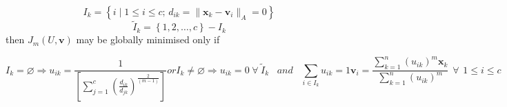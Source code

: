 \documentclass[english]{HSMW-Thesis}
\begin{document}
\begin{theorem}
	$$I_k=\left\lbrace i\mid 1\leq i \leq c;\hspace{2pt} d_{ik}=\parallel \mathbf{x}_k-\mathbf{v}_i\parallel_A=0\right\rbrace$$
	$$\tilde{I}_k=\left\lbrace 1,2,\ldots ,c\right\rbrace - I_k$$
	then\hspace{2pt} $J_m\left( U,\mathbf{v}\right)$\hspace{2pt} may be globally minimised only if
	
	\begin{subequations}
		\begin{equation}\label{membership function}
			I_k=\varnothing \Rightarrow u_{ik}=\frac{1}{\left[  \sum_{j=1}^{c}\left( \frac{d_{ik}}{d_{jk}}\right)^{\frac{2}{\left( m-1\right) }}\right]} 
		\end{equation}
		or \begin{equation}\label{membership function1}
			I_k\neq\varnothing \Rightarrow u_{ik}= 0 \hspace{3pt}\forall \hspace{3pt} \tilde{I}_k \hspace{10pt}and\hspace{10pt} \sum_{i\in I_k}u_{ik} =1 
		\end{equation}
		
		\begin{equation}\label{cluster center}
			\mathbf{v}_i=\frac{\sum_{k=1}^{n}\left( u_{ik}\right)^{m} \mathbf{x}_k}{\sum_{k=1}^{n}\left( u_{ik}\right) ^{m}} \hspace{5pt}\forall \hspace{5pt} 1\leq i \leq c
		\end{equation}
	\end{subequations}
	
\end{theorem}
\end{document}
